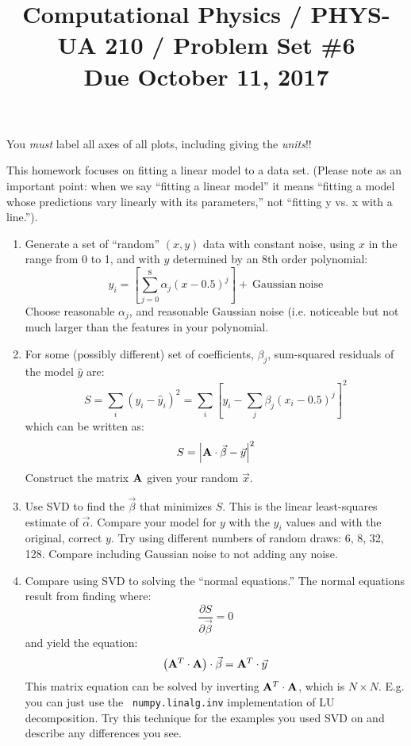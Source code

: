 \documentclass[11pt, preprint]{aastex}
\begin{document}
\title{\bf Computational Physics / PHYS-UA 210 / Problem Set \#6
\\ Due October 11, 2017 }

You {\it must} label all axes of all plots, including giving the {\it
  units}!!

This homework focuses on fitting a linear model to a data set.
(Please note as an important point: when we say ``fitting a linear
model'' it means ``fitting a model whose predictions vary linearly
with its parameters,'' not ``fitting y vs. x with a line.'').

\begin{enumerate}
\item Generate a set of ``random'' $(x,y)$ data with constant noise,
  using $x$ in the range from 0 to 1, and with $y$ determined by an
  8th order polynomial:
  \begin{equation}
 y_i = \left[\sum_{j=0}^8 \alpha_j (x-0.5)^j\right] +
 \mathrm{~Gaussian~noise}
  \end{equation}
  Choose reasonable $\alpha_j$, and reasonable Gaussian noise
  (i.e. noticeable but not much larger than the features in your
  polynomial. 
\item For some (possibly different) set of coefficients,
  $\beta_j$, sum-squared residuals of the model $\hat y$ are:
  \begin{equation}
    S = \sum_i (y_i - {\hat y}_i)^2 = \sum_i \left[y_i - \sum_j
      {\beta}_j (x_i - 0.5)^j\right]^2
  \end{equation}
  which can be written as:
  \begin{equation}
    S = \left|{\bf A}\cdot \vec{\beta} - \vec{y} \right|^2
  \end{equation}
  Construct the matrix ${\bf A}$ given your random $\vec{x}$.
\item Use SVD to find the $\vec{\beta}$ that minimizes $S$. This is
  the linear least-squares estimate of $\vec{\alpha}$. Compare your
  model for $y$ with the $y_i$ values and with the original, correct
  $y$.  Try using different numbers of random draws: 6, 8, 32, 128.
  Compare including Gaussian noise to not adding any noise.
\item Compare using SVD to solving the ``normal equations.'' 
  The normal equations result from finding where:
  \begin{equation}
    \frac{\partial S}{\partial \vec{\beta}} = 0
  \end{equation}
  and yield the equation:
  \begin{equation}
    \left({\bf A}^T\cdot {\bf A} \right)\cdot \vec{\beta} =
    {\bf A}^T\cdot\vec{y}
  \end{equation}
  This matrix equation can be solved by inverting ${\bf A}^T\cdot
  {\bf A}$, which is $N\times N$. E.g. you can just use the {\tt
    numpy.linalg.inv} implementation of LU decomposition. Try this
  technique for the examples you used SVD on and describe any
  differences you see.
\end{enumerate}
\end{document}
